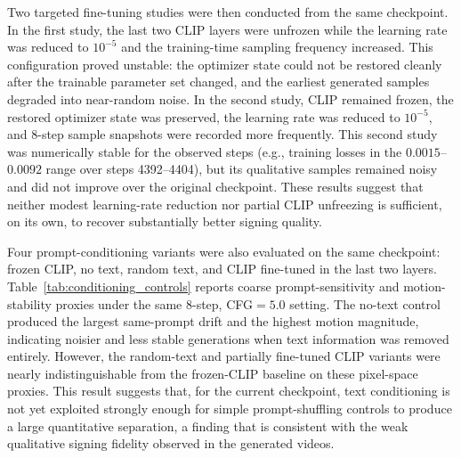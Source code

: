 \documentclass{ieeeaccess}
\begin{document}
{Two targeted fine-tuning studies were then conducted from the same checkpoint. In the first study, the last two CLIP layers were unfrozen while the learning rate was reduced to $10^{-5}$ and the training-time sampling frequency increased. This configuration proved unstable: the optimizer state could not be restored cleanly after the trainable parameter set changed, and the earliest generated samples degraded into near-random noise. In the second study, CLIP remained frozen, the restored optimizer state was preserved, the learning rate was reduced to $10^{-5}$, and 8-step sample snapshots were recorded more frequently. This second study was numerically stable for the observed steps (e.g., training losses in the $0.0015$--$0.0092$ range over steps 4392--4404), but its qualitative samples remained noisy and did not improve over the original checkpoint. These results suggest that neither modest learning-rate reduction nor partial CLIP unfreezing is sufficient, on its own, to recover substantially better signing quality.

Four prompt-conditioning variants were also evaluated on the same checkpoint: frozen CLIP, no text, random text, and CLIP fine-tuned in the last two layers. Table~\ref{tab:conditioning_controls} reports coarse prompt-sensitivity and motion-stability proxies under the same 8-step, CFG$=5.0$ setting. The no-text control produced the largest same-prompt drift and the highest motion magnitude, indicating noisier and less stable generations when text information was removed entirely. However, the random-text and partially fine-tuned CLIP variants were nearly indistinguishable from the frozen-CLIP baseline on these pixel-space proxies. This result suggests that, for the current checkpoint, text conditioning is not yet exploited strongly enough for simple prompt-shuffling controls to produce a large quantitative separation, a finding that is consistent with the weak qualitative signing fidelity observed in the generated videos.

}
\end{document}
